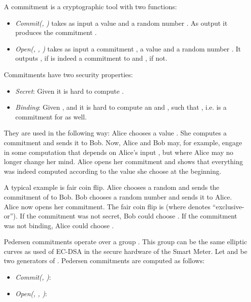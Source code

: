 \documentclass[english]{llncs}
\begin{document}
A commitment is a cryptographic tool with two functions:

\begin{itemize}

\item {\em Commit(, )}  takes as input a value  and a random number .
As output it produces the commitment .

\item {\em Open(, , )}  takes as input a commitment , a value  and a random number .
It outputs , if  is indeed a commitment to  and , if not.

\end{itemize}

Commitments have two security properties:

\begin{itemize}

\item {\em Secret}: Given  it is hard to compute .

\item {\em Binding}: Given ,  and  it is hard to compute an  and , such that , i.e.  is a commitment for  as well.

\end{itemize}

They are used in the following way:
Alice chooses a value .
She computes a commitment  and sends it to Bob.
Now, Alice and Bob may, for example, engage in some computation that depends on Alice's input , but where Alice may no longer change her mind.
Alice opens her commitment and shows that everything was indeed computed according to the value  she choose at the beginning.

A typical example is fair coin flip.
Alice chooses a random  and sends the commitment  of  to Bob.
Bob chooses a random number  and sends it to Alice.
Alice now opens her commitment.
The fair coin flip is  (where  denotes ``exclusive-or'').
If the commitment was not secret, Bob could choose .
If the commitment was not binding, Alice could choose .

Pedersen commitments operate over a group .
This group  can be the same elliptic curves as used of EC-DSA in the secure hardware of the Smart Meter.
Let  and  be two generators of .
Pedersen commitments are computed as follows:

\newcommand{\entspricht}{\mathrel{\widehat{=}}}
\newcommand{\isequal}{\stackrel{?}{=}}


\begin{itemize}

\item {\em Commit(, )}:


\item {\em Open(, , )}:


\end{itemize}
\end{document}
